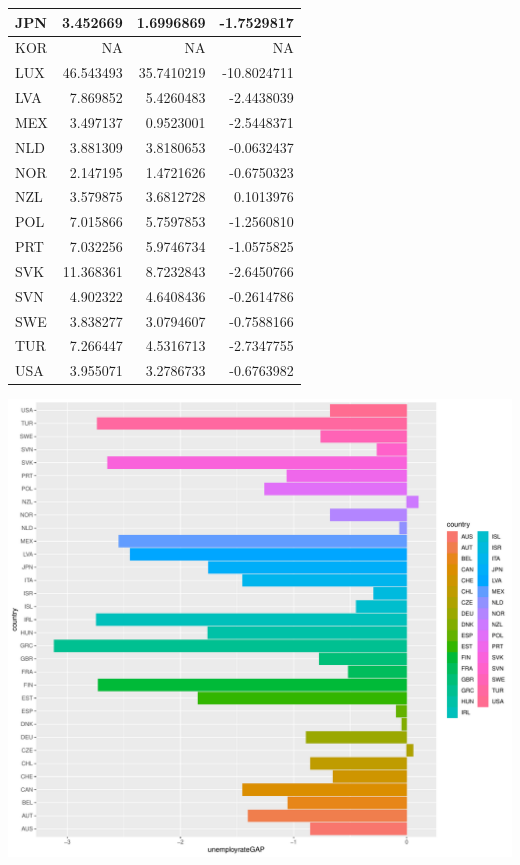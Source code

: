 \documentclass[11pt,a4paper,]{article}
\let\origfigure\figure
\let\endorigfigure\endfigure
\renewenvironment{figure}[1][2] {
    \expandafter\origfigure\expandafter[H]
} {
    \endorigfigure
}%
\begin{document}
\begin{table}
\begin{tabular}[t]{l|r|r|r}
JPN & 3.452669 & 1.6996869 & -1.7529817\\
\hline
KOR & NA & NA & NA\\
\hline
LUX & 46.543493 & 35.7410219 & -10.8024711\\
\hline
LVA & 7.869852 & 5.4260483 & -2.4438039\\
\hline
MEX & 3.497137 & 0.9523001 & -2.5448371\\
\hline
NLD & 3.881309 & 3.8180653 & -0.0632437\\
\hline
NOR & 2.147195 & 1.4721626 & -0.6750323\\
\hline
NZL & 3.579875 & 3.6812728 & 0.1013976\\
\hline
POL & 7.015866 & 5.7597853 & -1.2560810\\
\hline
PRT & 7.032256 & 5.9746734 & -1.0575825\\
\hline
SVK & 11.368361 & 8.7232843 & -2.6450766\\
\hline
SVN & 4.902322 & 4.6408436 & -0.2614786\\
\hline
SWE & 3.838277 & 3.0794607 & -0.7588166\\
\hline
TUR & 7.266447 & 4.5316713 & -2.7347755\\
\hline
USA & 3.955071 & 3.2786733 & -0.6763982\\
\hline
\end{tabular}
\end{table}

\newpage

\begin{figure}
\centering
\includegraphics{ETC5513assignment4_files/figure-latex/GAP-1.pdf}
\caption{\label{fig:GAP}unemployment gender gap}
\end{figure}
\end{document}
